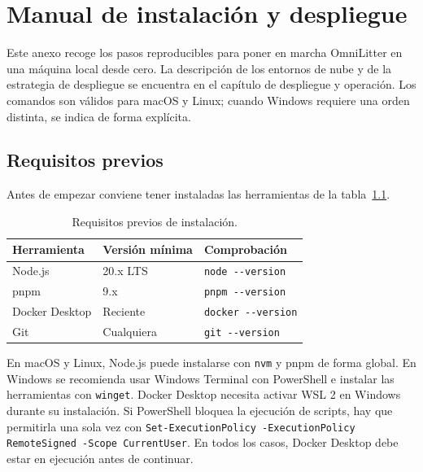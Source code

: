\chapter{Manual de instalación y despliegue}
\label{anexo:manual_despliegue}

\lstset{
  basicstyle=\ttfamily\small,
  breaklines=true,
  columns=fullflexible,
  keepspaces=true,
  frame=single,
  framesep=4pt,
  xleftmargin=4pt,
  aboveskip=0.8em,
  belowskip=0.8em
}

Este anexo recoge los pasos reproducibles para poner en marcha OmniLitter en una
máquina local desde cero. La descripción de los entornos de nube y de la estrategia de
despliegue se encuentra en el capítulo de despliegue y operación. Los comandos son
válidos para macOS y Linux; cuando Windows requiere una orden distinta, se indica de
forma explícita.

\section{Requisitos previos}

Antes de empezar conviene tener instaladas las herramientas de la
tabla~\ref{tab:requisitos_instalacion}.

\begin{table}[H]
\centering
\caption{Requisitos previos de instalación.}
\label{tab:requisitos_instalacion}
\small
\begin{tabularx}{\textwidth}{p{3.2cm} p{3.2cm} X}
\toprule
\textbf{Herramienta} & \textbf{Versión mínima} & \textbf{Comprobación} \\
\midrule
Node.js & 20.x LTS & \texttt{node -{}-version} \\
pnpm & 9.x & \texttt{pnpm -{}-version} \\
Docker Desktop & Reciente & \texttt{docker -{}-version} \\
Git & Cualquiera & \texttt{git -{}-version} \\
\bottomrule
\end{tabularx}
\end{table}

En macOS y Linux, Node.js puede instalarse con \texttt{nvm} y pnpm de forma global. En
Windows se recomienda usar Windows Terminal con PowerShell e instalar las herramientas
con \texttt{winget}. Docker Desktop necesita activar WSL 2 en Windows durante su
instalación. Si PowerShell bloquea la ejecución de scripts, hay que permitirla una sola
vez con \texttt{Set-ExecutionPolicy -ExecutionPolicy RemoteSigned -Scope CurrentUser}.
En todos los casos, Docker Desktop debe estar en ejecución antes de continuar.


